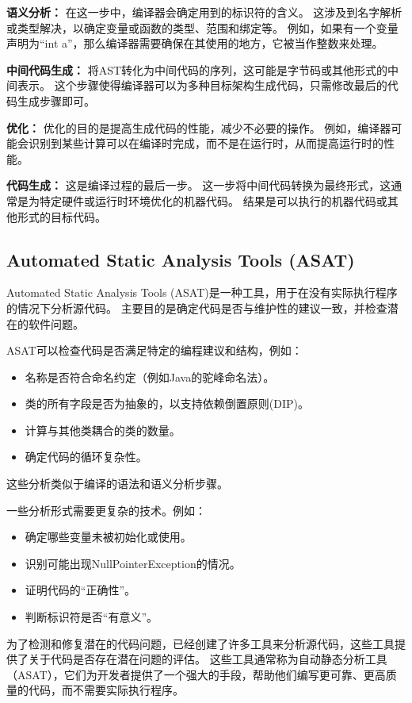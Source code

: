\textbf{语义分析：}
在这一步中，编译器会确定用到的标识符的含义。
这涉及到名字解析或类型解决，以确定变量或函数的类型、范围和绑定等。
例如，如果有一个变量声明为``int a”，那么编译器需要确保在其使用的地方，它被当作整数来处理。

\textbf{中间代码生成：}
将AST转化为中间代码的序列，这可能是字节码或其他形式的中间表示。
这个步骤使得编译器可以为多种目标架构生成代码，只需修改最后的代码生成步骤即可。

\textbf{优化：}
优化的目的是提高生成代码的性能，减少不必要的操作。
例如，编译器可能会识别到某些计算可以在编译时完成，而不是在运行时，从而提高运行时的性能。

\textbf{代码生成：}
这是编译过程的最后一步。
这一步将中间代码转换为最终形式，这通常是为特定硬件或运行时环境优化的机器代码。
结果是可以执行的机器代码或其他形式的目标代码。

\subsection{Automated Static Analysis Tools (ASAT)}

Automated Static Analysis Tools (ASAT)是一种工具，用于在没有实际执行程序的情况下分析源代码。
主要目的是确定代码是否与维护性的建议一致，并检查潜在的软件问题。

ASAT可以检查代码是否满足特定的编程建议和结构，例如：
\begin{itemize}
	\item 名称是否符合命名约定（例如Java的驼峰命名法）。
	\item 类的所有字段是否为抽象的，以支持依赖倒置原则(DIP)。
	\item 计算与其他类耦合的类的数量。
	\item 确定代码的循环复杂性。
\end{itemize}
这些分析类似于编译的语法和语义分析步骤。

一些分析形式需要更复杂的技术。例如：
\begin{itemize}
	\item 确定哪些变量未被初始化或使用。
	\item 识别可能出现NullPointerException的情况。
	\item 证明代码的“正确性”。
	\item 判断标识符是否“有意义”。
\end{itemize}


为了检测和修复潜在的代码问题，已经创建了许多工具来分析源代码，这些工具提供了关于代码是否存在潜在问题的评估。
这些工具通常称为自动静态分析工具（ASAT），它们为开发者提供了一个强大的手段，帮助他们编写更可靠、更高质量的代码，而不需要实际执行程序。

